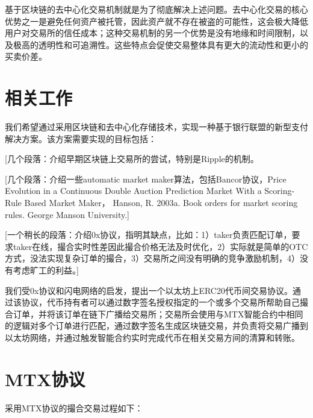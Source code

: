 \documentclass[UTF8,nofonts]{ctexart}
\makeatletter
\newenvironment{figurehere}
  {\def\@captype{figure}}
  {}
\makeatother
\begin{document}
基于区块链的去中心化交易机制就是为了彻底解决上述问题。去中心化交易的核心优势之一是避免任何资产被托管，因此资产就不存在被盗的可能性，这会极大降低用户对交易所的信任成本；这种交易机制的另一个优势是没有地缘和时间限制，以及极高的透明性和可追溯性。这些特点会促使交易整体具有更大的流动性和更小的买卖价差。

\section{相关工作\label{sec:existingworks}}
我们希望通过采用区块链\cite{nakamoto2008bitcoin,swan2015blockchain}和去中心化存储技术，实现一种基于银行联盟的新型支付解决方案。该方案需要实现的目标包括：

[几个段落：介绍早期区块链上交易所的尝试，特别是Ripple的机制。


[几个段落：介绍一些automatic market maker算法，包括Bancor协议，{Price Evolution in a Continuous Double Auction Prediction Market With a Scoring-Rule Based Market Maker}， {Hanson, R. 2003a. Book orders for market scoring rules. George Manson University.}]

[一个稍长的段落：介绍0x协议，指明其缺点，比如：1）taker负责匹配订单，要求taker在线，撮合实时性差因此撮合价格无法及时优化，2）实际就是简单的OTC方式，没法实现复杂订单的撮合，3）交易所之间没有明确的竞争激励机制，4）没有考虑旷工的利益。]

我们受0x协议和闪电网络的启发，提出一个以太坊上ERC20代币间交易协议。通过该协议，代币持有者可以通过数字签名授权指定的一个或多个交易所帮助自己撮合订单，并将该订单在链下广播给交易所；交易所会使用与MTX智能合约中相同的逻辑对多个订单进行匹配，通过数字签名生成区块链交易，并负责将交易广播到以太坊网络，并通过触发智能合约实时完成代币在相关交易方间的清算和转账。

\section{MTX协议\label{sec:protocol}}


采用MTX协议的撮合交易过程如下：
\end{document}

